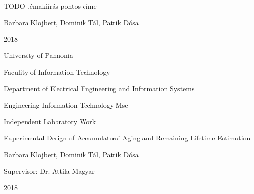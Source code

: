 \begin{titlepage}
	\setlength{\hoffset}{0mm}
	\pagestyle{empty}
	\begin{center} 
		~\\
		\vspace{125pt}	
		\Large 
		TODO témakiírás pontos címe
		\vspace{200pt}
		
		\Large 
		Barbara Klojbert, Dominik Tál, Patrik Dósa
		\vspace{60pt}
		
		\Large 
		2018
	\end{center}
	
	\newpage
	
	\pagestyle{empty}
	
	\newpage
	\pagestyle{empty}
	\begin{center}
		\Large
		University of Pannonia
		
		\vspace{10mm}
		Faculity of Information Technology
		
		\vspace{10mm}
		Department of Electrical Engineering and Information Systems
		
		\vspace{10mm}
		Engineering Information Technology Msc
		
		\vspace{40mm}
		\huge
		Independent Laboratory Work
		
		\vspace{10mm}
		\LARGE
		Experimental Design of Accumulators' Aging and Remaining Lifetime Estimation
		
		\vspace{10mm}
		\Large
		Barbara Klojbert, Dominik Tál, Patrik Dósa
		
		\vspace{15mm}
		Supervisor: Dr. Attila Magyar
		
		\vspace{20mm}
		2018
		\normalsize
	\end{center}
\end{titlepage}

\setlength{\hoffset}{4mm}
\newpage